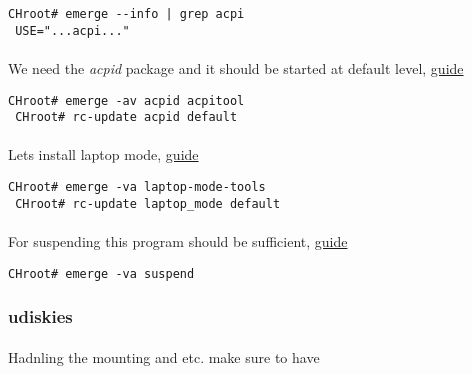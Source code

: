 \documentclass[10pt,a4paper]{article}
\begin{document}
                    \begin{lstlisting}[style=BashInputCHRoot]
 CHroot# emerge --info | grep acpi
 USE="...acpi..."
                    \end{lstlisting}

                    \paragraph{} We need the \textit{acpid} package and it should be started at default level, \href{https://wiki.gentoo.org/wiki/ACPI#Emerge}{guide}

                    \begin{lstlisting}[style=BashInputCHRoot]
 CHroot# emerge -av acpid acpitool
 CHroot# rc-update acpid default
                    \end{lstlisting}

                    \paragraph{} Lets install laptop mode, \href{https://wiki.gentoo.org/wiki/Power\_management/Guide#Installation}{guide}

                    \begin{lstlisting}[style=BashInputCHRoot]
 CHroot# emerge -va laptop-mode-tools
 CHroot# rc-update laptop_mode default
                    \end{lstlisting}

                    \paragraph{} For suspending this program should be sufficient, \href{https://wiki.gentoo.org/wiki/Suspend\_and\_hibernate#Software}{guide}

                    \begin{lstlisting}[style=BashInputCHRoot]
 CHroot# emerge -va suspend
                    \end{lstlisting}

                \newpage
                \subsubsection{udiskies}

                    \paragraph{} Hadnling the mounting and etc. make sure to have
\end{document}
